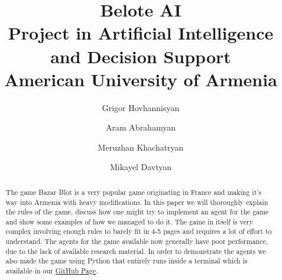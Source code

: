 \documentclass[a4paper,12pt]{article}
\title{
    Belote AI \\
        \large Project in Artificial Intelligence and Decision Support \\ American University of Armenia \\
}
\author{Grigor Hovhannisyan
\and
Aram Abrahamyan
\and
Meruzhan Khachatryan
\and
Mikayel Davtyan
}
\begin{document}
\pagecolor{black}
\color{white}

{ %
\maketitle\thispagestyle{empty}
\vspace{1cm}{}
}
\vspace{1cm}


{
    \newpage
    \hypersetup{linkcolor=white} %
    \tableofcontents
}

\newpage
{}
\begin{abstract}
    The game Bazar Blot is a very popular game originating in France and making it's way into Armenia with heavy modifications.
    In this paper we will thoroughly explain the rules of the game, discuss how one might try to implement an agent for the game and show some examples of how we managed to do it.
    The game in itself is very complex involving enough rules to barely fit in 4-5 pages and requires a lot of effort to understand.
    The agents for the game available now generally have poor performance, due to the lack of available research material.
    In order to demonstrate the agents we also made the game using Python that entirely runs inside a terminal which is available in our \href{https://github.com/aramabrahamyan1703/BeloteAI}{GitHub Page}.
\end{abstract}

\newpage
\pagestyle{fancy} %
\lhead{\nouppercase{\rightmark}}
\rhead{}









\newpage
\thispagestyle{SectionFirstPage} %
\rhead{}
\renewcommand\refname{References}
\printbibliography
\end{document}
